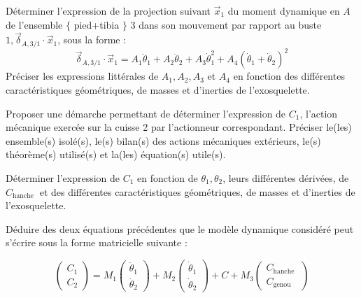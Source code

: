 \documentclass[11pt]{article}
\begin{document}
\UPSTIquestion Déterminer l'expression de la projection suivant $\vec{x}_{1}$ du moment dynamique en $A$ de l'ensemble $\{$ pied+tibia $\}$ 3 dans son mouvement par rapport au buste $1, \vec{\delta}_{A, 3 / 1} \cdot \vec{x}_{1}$, sous la forme :
$$
\vec{\delta}_{A, 3 / 1} \cdot \vec{x}_{1}=A_{1} \ddot{\theta}_{1}+A_{2} \ddot{\theta}_{2}+A_{3} \dot{\theta}_{1}^{2}+A_{4}\left(\dot{\theta}_{1}+\dot{\theta}_{2}\right)^{2}
$$
Préciser les expressions littérales de $A_{1}, A_{2}, A_{3}$ et $A_{4}$ en fonction des différentes caractéristiques géométriques, de masses et d'inerties de l'exosquelette.
\begin{UPSTIcorrige}

\end{UPSTIcorrige}

\UPSTIquestion Proposer une démarche permettant de déterminer l'expression de $C_{1}$, l'action mécanique exercée sur la cuisse 2 par l'actionneur correspondant. Préciser le(les) ensemble(s) isolé(s), le(s) bilan(s) des actions mécaniques extérieurs, le(s) théorème(s) utilisé(s) et la(les) équation(s) utile(s).
\begin{UPSTIcorrige}

\end{UPSTIcorrige}

\UPSTIquestion Déterminer l'expression de $C_{1}$ en fonction de $\theta_{1}, \theta_{2}$, leurs différentes dérivées, de $C_{\textrm {hanche }}$ et des différentes caractéristiques géométriques, de masses et d'inerties de l'exosquelette.
\begin{UPSTIcorrige}

\end{UPSTIcorrige}

\UPSTIquestion  Déduire des deux équations précédentes que le modèle dynamique considéré peut s'écrire sous la forme matricielle suivante :

$$
\left(\begin{array}{l}
C_{1} \\
C_{2}
\end{array}\right)=M_{1}\left(\begin{array}{c}
\ddot{\theta}_{1} \\
\ddot{\theta}_{2}
\end{array}\right)+M_{2}\left(\begin{array}{c}
\dot{\theta}_{1} \\
\dot{\theta}_{2}
\end{array}\right)+C+M_{3}\left(\begin{array}{c}
C_{\textrm {hanche }} \\
C_{\textrm {genou }}
\end{array}\right)
$$
\begin{UPSTIcorrige}

\end{UPSTIcorrige}
\end{document}
